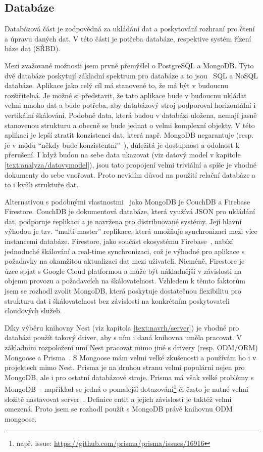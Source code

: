 \subsection{Databáze}\label{text:navrh/databaze}

Databázová část je zodpovědná za ukládání dat a poskytování rozhraní pro čtení a úpravu daných dat. 
V této části je potřeba databáze, respektive systém řízení báze dat (SŘBD).

Mezi zvažované možnosti jsem prvně přemýšlel o PostgreSQL a MongoDB.
Tyto dvě databáze poskytují základní spektrum pro databáze a to jsou~\cite{irena2015big, marek2018sql} SQL a NoSQL databáze. 
Aplikace jako celý cíl má stanovené to, že má být v budoucnu rozšiřitelná.
Je možné si představit, že tato aplikace bude v budoucnu ukládat velmi mnoho dat a bude potřeba, aby databázový stroj podporoval horizontální i vertikální škálování.
Podobně data, která budou v databázi uložena, nemají jasně stanovenou strukturu a obecně se bude jednat o velmi komplexní objekty.
V této aplikaci je lepší ztratit konzistenci dat, která např. MongoDB negarantuje (resp. je v módu \enquote{někdy bude konzistentní}~\cite{irena2015big}), důležitá je dostupnost a odolnost k přerušení.
I když budou na sebe data ukazovat (viz datový model v kapitole \ref{text:analyza/datovymodel}), jsou tato propojení velmi triviální a spíše je vhodné dokumenty do sebe vnořovat.
Proto nevidím důvod na použití relační databáze a to i kvůli struktuře dat.

Alternativou s podobnými vlastnostmi~\cite{irena2015big} jako MongoDB je CouchDB a Firebase Firestore. 
CouchDB je dokumentová databáze, která využívá JSON pro ukládání dat, podporuje replikaci a je navržena pro distribuované systémy. 
Její hlavní výhodou je tzv. \enquote{multi-master} replikace, která umožňuje synchronizaci mezi více instancemi databáze. 
Firestore, jako součást ekosystému Firebase~\cite{firebase}, nabízí jednoduché škálování a real-time synchronizaci, což je výhodné pro aplikace s požadavky na okamžitou aktualizaci dat mezi uživateli. 
Nicméně, Firestore je úzce spjat s Google Cloud platformou a může být nákladnější v závislosti na objemu provozu a požadavcích na škálovatelnost. 
Vzhledem k těmto faktorům jsem se rozhodl zvolit MongoDB, která poskytuje dostatečnou flexibilitu pro strukturu dat i škálovatelnost bez závislosti na konkrétním poskytovateli cloudových služeb.

Díky výběru knihovny Nest (viz kapitola \ref{text:navrh/server}) je vhodné pro databázi použít takový driver, aby s ním i daná knihovna uměla pracovat.
V základním rozpoložení umí Nest pracovat mimo jiné s drivery (resp. ODM/ORM) Mongoose a Prisma~\cite{nest_database}.
S Mongoose mám velmi velké zkušenosti a používám ho i v projektech mimo Nest.
Prisma je na druhou stranu velmi populární nejen pro MongoDB, ale i pro ostatní databázové stroje.
Prisma má však velké problémy s MongoDB -- například se jedná o pomalejší dotazování\footnote{např. issue: \url{https://github.com/prisma/prisma/issues/16916}} či často je nutné velmi složitě nastavovat server~\cite{prisma_2025}.
Definice entit a jejich závislostí je taktéž velmi omezená.
Proto jsem se rozhodl použít s MongoDB právě knihovnu ODM mongoose.

